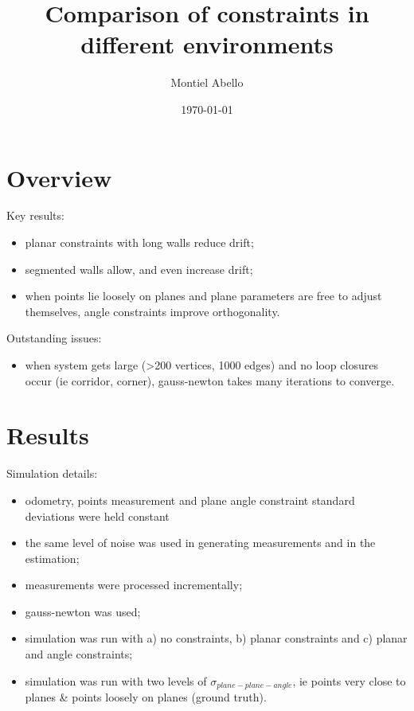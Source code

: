 \documentclass[a4paper,11pt]{article}
\newcommand{\subtitle}[1]{%
  \posttitle{%
    \par\end{center}
    \begin{center}\large#1\end{center}
    \vskip0.5em}%
}
\begin{document}
\title{\vspace{-4em}\textbf{Comparison of constraints in different environments}}
\subtitle{\vspace{-2em}}
\author{Montiel Abello}
\date{\today}

\maketitle

\section{Overview}

Key results:
\begin{itemize}
\item planar constraints with long walls reduce drift;
\item segmented walls allow, and even increase drift;
\item when points lie loosely on planes and plane parameters are free to adjust themselves, angle constraints improve orthogonality.
\end{itemize}

Outstanding issues:
\begin{itemize}
\item when system gets large (>200 vertices, 1000 edges) and no loop closures occur (ie corridor, corner), gauss-newton takes many iterations to converge. 
\end{itemize}

\section{Results}
Simulation details:
\begin{itemize}
\item odometry, points measurement and plane angle constraint standard deviations were held constant
\item the same level of noise was used in generating measurements and in the estimation;
\item measurements were processed incrementally;
\item gauss-newton was used;
\item simulation was run with a) no constraints, b) planar constraints and c) planar and angle constraints;
\item simulation was run with two levels of $\sigma_{plane-plane-angle}$, ie points very close to planes \& points loosely on planes (ground truth).
\end{itemize}
\end{document}
